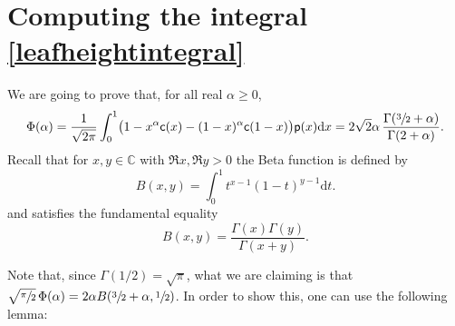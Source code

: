 \documentclass[11pt]{article}
\newcommand{\pp}{\mathsf{p}}
\newcommand{\dd}{\mathrm{d}}
\theoremstyle{definition}
\begin{document}
\section{Computing the integral \texorpdfstring{\eqref{leafheightintegral}}{ref}}\label{sec: Appendix}
We are going to prove that, for all real $\alpha\geq 0$,
\begin{equation}\label{eq:Phi(alpha)}
\Phi(\alpha) = \frac{1}{\sqrt{2\pi}}\int_{0}^1 \bigl(1-x^{\alpha}\ff(x)-(1-x)^{\alpha}\ff(1-x) \bigr) \pp(x) \dd x=2\sqrt{2}\alpha\,\frac{\Gamma(\sfrac{3}{2}+\alpha)}{\Gamma(2+\alpha)}.
\end{equation}
Recall that for $x, y \in \mathbb{C}$ with $\Re x, \Re y > 0$ the Beta function is defined by
\[
B(x,y) = \int_0^1 t^{x-1} (1-t)^{y-1} \dd t.
\]
and satisfies the fundamental equality
\[
B(x,y) = \frac{\Gamma(x)\Gamma(y)}{\Gamma(x+y)}.
\]

Note that, since $\Gamma(1/2)=\sqrt{\pi}$, what we are claiming is that $\sqrt{\sfrac{\pi}{2}}\,\Phi(\alpha)=2\alpha B(\sfrac{3}{2}+\alpha, \sfrac{1}{2})$. In order to show this, one can use the following lemma:
\end{document}
